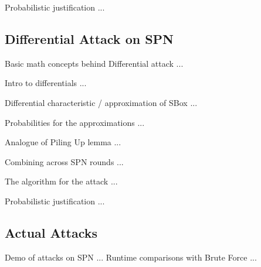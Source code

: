 \documentclass[9pt]{beamer}
\begin{document}
\begin{frame}
Probabilistic justification ...

\end{frame}

\subsection{Differential Attack on SPN}
\begin{frame}
Basic math concepts behind Differential attack ...

\end{frame}

\begin{frame}
Intro to differentials ... 

\end{frame}

\begin{frame}
Differential characteristic / approximation of SBox ...

\end{frame}

\begin{frame}
Probabilities for the approximations ...

\end{frame}

\begin{frame}
Analogue of Piling Up lemma ...

\end{frame}

\begin{frame}
Combining across SPN rounds ... 

\end{frame}

\begin{frame}
The algorithm for the attack ... 

\end{frame}

\begin{frame}
Probabilistic justification ...

\end{frame}

\subsection{Actual Attacks}
\begin{frame}
Demo of attacks on SPN ... Runtime comparisons with Brute Force ...

\end{frame}
\end{document}
